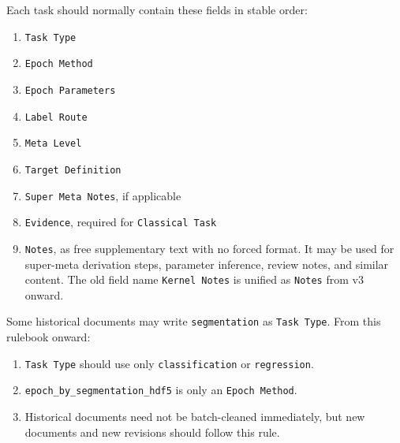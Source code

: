 \begin{tcolorbox}
\smallskip{}\par\smallskip

\noindent Each task should normally contain these fields in stable order:\par\smallskip

\begin{enumerate}[leftmargin=1.5em,noitemsep,topsep=2pt]
\item \texttt{Task Type}
\item \texttt{Epoch Method}
\item \texttt{Epoch Parameters}
\item \texttt{Label Route}
\item \texttt{Meta Level}
\item \texttt{Target Definition}
\item \texttt{Super Meta Notes}, if applicable
\item \texttt{Evidence}, required for \texttt{Classical Task}
\item \texttt{Notes}, as free supplementary text with no forced format. It may be used for super-meta derivation steps, parameter inference, review notes, and similar content. The old field name \texttt{Kernel Notes} is unified as \texttt{Notes} from v3 onward.
\end{enumerate}

\smallskip{}\par\smallskip

\noindent Some historical documents may write \texttt{segmentation} as \texttt{Task Type}. From this rulebook onward:\par\smallskip

\begin{enumerate}[leftmargin=1.5em,noitemsep,topsep=2pt]
\item \texttt{Task Type} should use only \texttt{classification} or \texttt{regression}.
\item \texttt{epoch\_by\_segmentation\_hdf5} is only an \texttt{Epoch Method}.
\item Historical documents need not be batch-cleaned immediately, but new documents and new revisions should follow this rule.
\end{enumerate}

\smallskip{}\par\smallskip


\end{tcolorbox}

